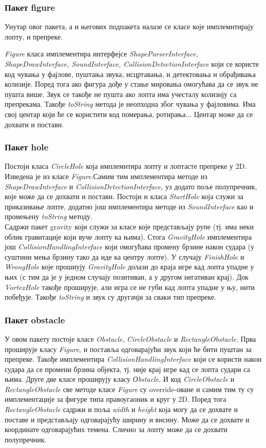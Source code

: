 \subsubsection{Пакет figure}
Унутар овог пакета, а и његових подпакета налазе се класе које имплемнтирају лопту, и препреке. 

\emph{Figure} класа имплементира интерфејсе \emph{ShapeParserInterface, ShapeDrawInterface, SoundInterface, CollisionDetectionInterface} који се користе код чувања у фајлове, пуштања звука, исцртавања, и детектовања и обрађивања колизије. Поред тога ако фигура дође у стање мировања омогућава да се звук не пушта више. Звук се такође не пушта ако лопта има учесталу колизију са препрекама. Такође \emph{toString} метода је неопходна због чувања у фајловима. Има  свој центар који ће се користити код померања, ротирања... Центар може да се дохвати и постави.


\subsubsection{Пакет hole}
Постоји класа \emph{CircleHole} која имплемнтира лопту и лоптасте препреке у 2D. Изведена је из класе \emph{Figure}.Самим тим имплементира методе из \emph{ShapeDrawInterface} и \emph{CollisionDetectionInterface}, уз додато поље полупречник, које може да се дохвати и постави.
Постоји и класа \emph{StartHole} која служи за приказивање лопте, додатно још имплементира методе из \emph{SoundInterface} као и промењену \emph{toString} методу. 
\\ \indent Садржи  пакет gravity који служи за класе које представљају рупе (тј. има неки облик гравитације који вуче лопту ка њима). Стога \emph{ GravityHole} имплементира још \emph{CollisionHandlingInterface} који омогућава промену брзине након судара (у суштини мења брзину тако да иде ка центру лопте). У случају \emph{FinishHole} и \emph{WrongHole} које прошиују \emph{GravityHole} долази до краја игре кад лопта упадне у њих (с тим да је у једном случају позитиван, а у другом негативан крај). Док \emph{VortexHole} такође проширује, али игра се не губи кад лопта упадне у њу, нити побеђује. Такође \emph{toString} и звук су другачји за сваки тип препреке.
\subsubsection{Пакет obstacle}
У овом пакету постоје класе \emph{Obstacle}, \emph{CircleObstacle} и \emph{RectangleObstacle}. Прва проширује класу \emph{Figure}, и поставља одговарајући звук који ће бити пуштан за препреке. Такође имплементира \emph{CollisionHandlingInterface} који се користи након судара да се промени брзина објекта, тј. није крај игре кад се лопта судари са њима. Друге две класе проширују класу \emph{Оbstacle}. И код \emph{CircleObstacle} и \emph{RectangleObstacle} све методе класе \emph{Figure} су override-оване и самим тим ту су имплементације за фигуре типа правоугаоник и круг у 2D. Поред тога \emph{RectangleObstacle} садржи и поља \emph{width} и \emph{height} која могу да се дохвате и поставе и представљају одговарајућу ширину и висину. Може да се дохвате и координате одговарајућих темена. Слично за лопту може да се дохвати полупречник.

